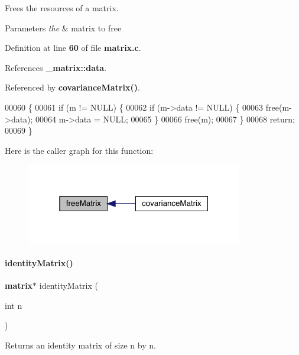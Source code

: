 Frees the resources of a matrix. 


\begin{DoxyParams}{Parameters}
{\em the} & matrix to free \\
\hline
\end{DoxyParams}


Definition at line \textbf{ 60} of file \textbf{ matrix.\+c}.



References \textbf{ \+\_\+matrix\+::data}.



Referenced by \textbf{ covariance\+Matrix()}.


\begin{DoxyCode}
00060                            \{
00061     \textcolor{keywordflow}{if} (m != NULL) \{
00062         \textcolor{keywordflow}{if} (m->data != NULL) \{
00063             free(m->data);
00064             m->data = NULL;
00065         \}
00066         free(m);
00067     \}
00068     \textcolor{keywordflow}{return};
00069 \}
\end{DoxyCode}
Here is the caller graph for this function\+:\nopagebreak
\begin{figure}[H]
\begin{center}
\leavevmode
\includegraphics[width=268pt]{matrix_8c_ae98365c910e9d688d2bdedec50d89a6b_icgraph}
\end{center}
\end{figure}
\mbox{\label{matrix_8c_aa3f5e409b1641373be7cf7284e216d1a}} 
\paragraph{identity\+Matrix()}
{\footnotesize\ttfamily \textbf{ matrix}$\ast$ identity\+Matrix (\begin{DoxyParamCaption}\item[{int}]{n }\end{DoxyParamCaption})}



Returns an identity matrix of size n by n. 


